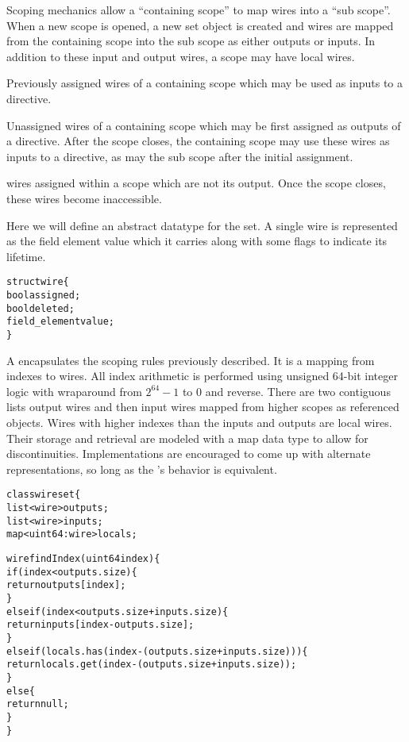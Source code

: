 Scoping mechanics allow a ``containing scope'' to map wires into a ``sub scope''.
When a new scope is opened, a new  set object is created and wires are mapped from the containing scope into the sub scope as either outputs or inputs.
In addition to these input and output wires, a scope may have local wires.
\begin{description}[labelindent=0.375in]
    \item[Input] Previously assigned wires of a containing scope which may be used as inputs to a directive.
    \item[Output] Unassigned wires of a containing scope which may be first assigned as outputs of a directive.
    After the scope closes, the containing scope may use these wires as inputs to a directive, as may the sub scope after the initial assignment.
    \item[Local] wires assigned within a scope which are not its output.
    Once the scope closes, these wires become inaccessible.
\end{description}

Here we will define an abstract datatype for the  set.
A single wire is represented as the field element value which it carries along with some flags to indicate its lifetime.\\

\begin{alltt}\ttSem
struct wire \{
  bool assigned;
  bool deleted;
  field_element value;
\}
\end{alltt}

A  encapsulates the scoping rules previously described.
It is a mapping from indexes to wires.
All index arithmetic is performed using unsigned 64-bit integer logic with wraparound from $2^{64}-1$ to $0$ and reverse.
There are two contiguous lists output wires and then input wires mapped from higher scopes as referenced objects.
Wires with higher indexes than the inputs and outputs are local wires.
Their storage and retrieval are modeled with a map data type to allow for discontinuities.
Implementations are encouraged to come up with alternate representations, so long as the 's behavior is equivalent.\\


\begin{alltt}\ttSem
class wireset \{
  list<wire> outputs;
  list<wire> inputs;
  map<uint64 : wire> locals;

  wire findIndex(uint64 index) \{
    if(index < outputs.size) \{
      return outputs[index];
    \}
    else if(index < outputs.size + inputs.size) \{
      return inputs[index - outputs.size];
    \}
    else if(locals.has(index - (outputs.size + inputs.size))) \{
      return locals.get(index - (outputs.size + inputs.size));
    \}
    else \{
      return null;
    \}
  \}
\end{alltt}

